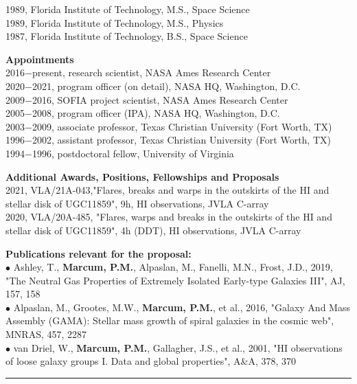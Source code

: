 1989, Florida Institute of Technology, M.S., Space Science\\
1989, Florida Institute of Technology, M.S., Physics\\
1987, Florida Institute of Technology, B.S., Space Science
\par \vspace{-0.5em}
\textbf{Appointments}\\
2016$-$present, research scientist, NASA Ames Research Center\\
2020$-$2021, program officer (on detail), NASA HQ, Washington, D.C.\\
2009$-$2016, SOFIA project scientist, NASA Ames Research Center\\
2005$-$2008, program officer (IPA), NASA HQ, Washington, D.C.\\
2003$-$2009, associate professor, Texas Christian University (Fort Worth, TX)\\
1996$-$2002, assistant professor, Texas Christian University (Fort Worth, TX)\\
1994$-$1996, postdoctoral fellow, University of Virginia
\par \vspace{-0.5em}
\textbf{Additional Awards, Positions, Fellowships and Proposals}\\
2021, VLA/21A-043,"Flares, breaks and warps in the outskirts of the HI and stellar disk of UGC11859", 9h, HI observations, JVLA C-array\\
2020, VLA/20A-485, "Flares, warps and breaks in the outskirts of the HI and stellar disk of UGC11859", 4h (DDT), HI observations, JVLA C-array
\par \vspace{-0.5em}
\textbf{Publications relevant for the proposal:}\\
{\scriptsize{$\bullet$}} Ashley, T., \textbf{Marcum, P.M.}, Alpaslan, M., Fanelli, M.N., Frost, J.D., 2019, "The Neutral Gas Properties of Extremely Isolated Early-type Galaxies III", AJ, 157, 158\\
{\scriptsize{$\bullet$}} Alpaslan, M., Grootes, M.W., \textbf{Marcum, P.M.}, et al., 2016, "Galaxy And Mass Assembly (GAMA): Stellar mass growth of spiral galaxies in the cosmic web", MNRAS, 457, 2287\\
{\scriptsize{$\bullet$}} van Driel, W., \textbf{Marcum, P.M.}, Gallagher, J.S., et al., 2001, "HI observations of loose galaxy groups I. Data and global properties", A\&A, 378, 370
\medskip \hrule \vspace{5pt} \medskip